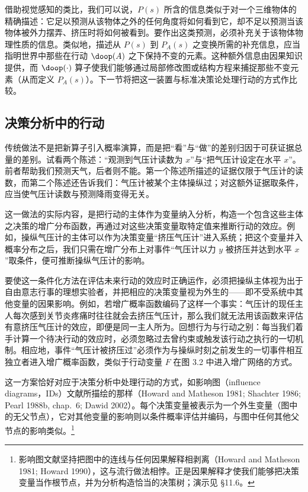 借助视觉感知的类比，我们可以说，$P(s)$ 所含的信息类似于对一个三维物体的精确描述：它足以预测从该物体之外的任何角度将如何看到它，却不足以预测当该物体被外力摆弄、挤压时将如何被看到。要作出这类预测，必须补充关于该物体物理性质的信息。类似地，描述从 $P(s)$ 到 $P_A(s)$ 之变换所需的补充信息，应当指明世界中那些在行动 $\doop(A)$ 之下保持不变的元素。这种额外信息由因果知识提供，而 $\doop(\cdot)$ 算子使我们能够通过局部修改图或结构方程来捕捉那些不变元素（从而定义 $P_A(s)$）。下一节将把这一装置与标准决策论处理行动的方式作比较。

\subsection{决策分析中的行动}

传统做法不是把新算子引入概率演算，而是把“看”与“做”的差别归因于可获证据总量的差别。试看两个陈述：“观测到气压计读数为 $x$”与“把气压计设定在水平 $x$”。前者帮助我们预测天气，后者则不能。第一个陈述所描述的证据仅限于气压计的读数，而第二个陈述还告诉我们：气压计被某个主体操纵过；对这额外证据取条件，应当使气压计读数与预测降雨变得无关。

这一做法的实际内容，是把行动的主体作为变量纳入分析，构造一个包含这些主体之决策的增广分布函数，再通过对这些决策变量取特定值来推断行动的效应。例如，操纵气压计的主体可以作为决策变量“挤压气压计”进入系统；把这个变量并入概率分布之后，我们只需在增广分布上对事件“气压计以力 $y$ 被挤压并达到水平 $x$”取条件，便可推断操纵气压计的影响。

要使这一条件化方法在评估未来行动的效应时正确运作，必须把操纵主体视为出于自由意志行事的理想实验者，并把相应的决策变量视为外生的——即不受系统中其他变量的因果影响。例如，若增广概率函数编码了这样一个事实：气压计的现任主人每次感到关节炎疼痛时往往就会去挤压气压计，那么我们就无法用该函数来评估有意挤压气压计的效应，即便是同一主人所为。回想行为与行动之别：每当我们着手计算一个待决行动的效应时，必须忽略过去曾约束或触发该行动之执行的一切机制。相应地，事件“气压计被挤压过”必须作为与操纵时刻之前发生的一切事件相互独立者进入增广概率函数，类似于行动变量 $F$ 在图 3.2 中进入增广网络的方式。

这一方案恰好对应于决策分析中处理行动的方式，如影响图（influence diagrams，IDs）文献所描绘的那样（Howard and Matheson 1981; Shachter 1986; Pearl 1988b, chap.~6; Dawid 2002）。每个决策变量被表示为一个外生变量（图中的无父节点），它对其他变量的影响则以条件概率评估并编码，与图中任何其他父节点的影响类似。\footnote{影响图文献坚持把图中的连线与任何因果解释相剥离（Howard and Matheson 1981; Howard 1990），这与流行做法相悖。正是因果解释才使我们能够把决策变量当作根节点，并为分析构造恰当的决策树；演示见 \S 11.6。}

